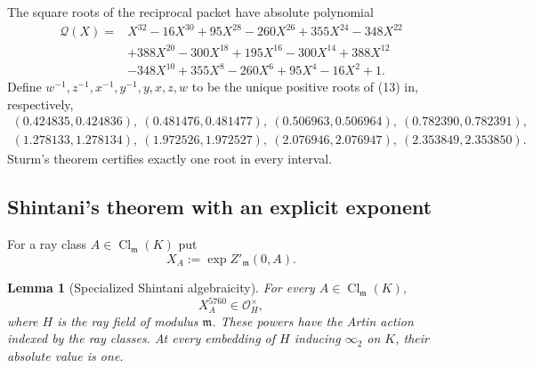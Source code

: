 \documentclass[11pt]{article}
\newtheorem{lemma}[theorem]{Lemma}
\newcommand{\Cl}{\operatorname{Cl}}
\begin{document}
The square roots of the reciprocal packet have absolute polynomial
\[
\begin{aligned}
\mathcal Q(X)={}&X^{32}-16X^{30}+95X^{28}-260X^{26}+355X^{24}
-348X^{22}\\
&+388X^{20}-300X^{18}+195X^{16}-300X^{14}+388X^{12}\\
&-348X^{10}+355X^8-260X^6+95X^4-16X^2+1.
\end{aligned}
\tag{13}
\]
Define $w^{-1},z^{-1},x^{-1},y^{-1},y,x,z,w$ to be the unique
positive roots of (13) in, respectively,
\[
\begin{gathered}
(0.424835,0.424836),\ (0.481476,0.481477),\
(0.506963,0.506964),\ (0.782390,0.782391),\\
(1.278133,1.278134),\ (1.972526,1.972527),\
(2.076946,2.076947),\ (2.353849,2.353850).
\end{gathered}
\tag{14}
\]
Sturm's theorem certifies exactly one root in every interval.

\subsection{Shintani's theorem with an explicit exponent}

For a ray class $A\in\Cl_{\mathfrak m}(K)$ put
\[
 X_A:=\exp Z'_{\mathfrak m}(0,A).
\]

\begin{lemma}[Specialized Shintani algebraicity]\label{lem:shintani}
For every $A\in\Cl_{\mathfrak m}(K)$,
\[
 X_A^{5760}\in\mathcal O_H^\times,
\]
where $H$ is the ray field of modulus $\mathfrak m$.  These powers have
the Artin action indexed by the ray classes.  At every embedding of
$H$ inducing $\infty_2$ on $K$, their absolute value is one.
\end{lemma}
\end{document}
